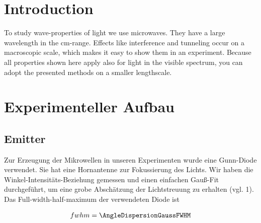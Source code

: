 \documentclass[a4paper,10pt,twocolumn]{article}
\begin{document}
    \section{Introduction}
    To study wave-properties of light we use microwaves.
    They have a large wavelength in the cm-range.
    Effects like interference and tunneling occur on a macroscopic scale, which makes it easy to show them
    in an experiment.
    Because all properties shown here apply also for light in the visible spectrum, you can 
    adopt the presented methods on a smaller lengthscale.
    \section{Experimenteller Aufbau}
    \subsection{Emitter}

    


    Zur Erzeugung der Mikrowellen in unseren Experimenten wurde eine Gunn-Diode verwendet. 
    Sie hat eine Hornantenne zur Fokussierung des Lichts. 
    Wir haben die Winkel-Intensitäts-Beziehung gemessen und einen
    einfachen Gauß-Fit durchgeführt, um eine grobe Abschätzung der Lichtstreuung zu erhalten (vgl. 1). 
    Das Full-width-half-maximum der verwendeten Diode ist
    
    \begin{align*}
        fwhm = \AngleDispersionGaussFWHM
    \end{align*}
    
\end{document}
